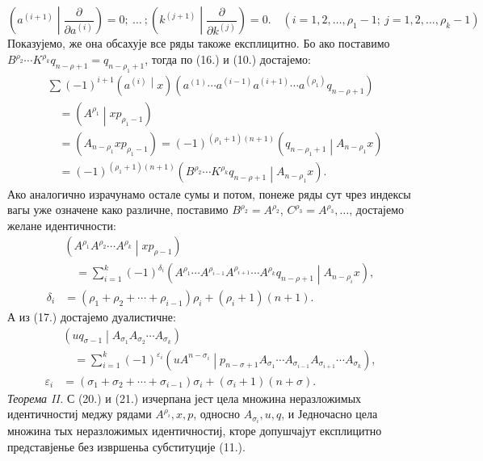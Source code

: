 \documentclass[11pt]{article}
\newcommand{\pair}[2]{\left(#1\middle|#2\right)}
\newcommand{\eps}{\varepsilon}
\begin{document}
\begin{equation}
 \left(a^{(i+1)}\middle|\frac{\partial}{\partial a^{(i)}}\right)=0;\ \ldots\ ;
 \left(k^{(j+1)}\middle|\frac{\partial}{\partial k^{(j)}}\right)=0.
 \quad (i=1,2,\ldots,\rho_1-1;\ j=1,2,\ldots,\rho_k-1)
\tag{19}
\end{equation}
Показујемо, же она обсахује все ряды такоже експлицитно. Бо ако поставимо $B^{\rho_2}\cdots K^{\rho_k}q_{n-\rho+1}=q_{n-\rho_1+1}$, тогда по (16.) и (10.) достајемо:
\[
\begin{aligned}
&\sum(-1)^{i+1}\pair{a^{(i)}}{x}
(a^{(1)}\cdots a^{(i-1)}a^{(i+1)}\cdots a^{(\rho_1)}q_{n-\rho+1})\\
&\quad=\pair{A^{\rho_1}}{xp_{\rho_1-1}}\\
&\quad=(A_{n-\rho_1}xp_{\rho_1-1})
=(-1)^{(\rho_1+1)(n+1)}\pair{q_{n-\rho_1+1}}{A_{n-\rho_1}x}\\
&\quad=(-1)^{(\rho_1+1)(n+1)}
\pair{B^{\rho_2}\cdots K^{\rho_k}q_{n-\rho+1}}{A_{n-\rho_1}x}.
\end{aligned}
\]
Ако аналогично израчунамо остале сумы и потом, понеже ряды сут чрез индексы вагы уже означене како различне, поставимо $B^{\rho_2}=A^{\rho_2}$, $C^{\rho_3}=A^{\rho_3},\ldots$, достајемо желане идентичности:
\begin{equation}
\begin{aligned}
&\pair{A^{\rho_1}A^{\rho_2}\cdots A^{\rho_k}}{xp_{\rho-1}}\\
&\quad=\sum_{i=1}^{k}(-1)^{\delta_i}
\pair{A^{\rho_1}\cdots A^{\rho_{i-1}}A^{\rho_{i+1}}\cdots A^{\rho_k}q_{n-\rho+1}}{A_{n-\rho_i}x},\\
\delta_i&=(\rho_1+\rho_2+\cdots+\rho_{i-1})\rho_i+(\rho_i+1)(n+1).
\end{aligned}
\tag{20}
\end{equation}
А из (17.) достајемо дуалистичне:
\begin{equation}
\begin{aligned}
&\pair{u q_{\sigma-1}}{A_{\sigma_1}A_{\sigma_2}\cdots A_{\sigma_k}}\\
&\quad=\sum_{i=1}^{k}(-1)^{\eps_i}
\pair{u A^{n-\sigma_i}}{p_{n-\sigma+1}A_{\sigma_1}\cdots A_{\sigma_{i-1}}A_{\sigma_{i+1}}\cdots A_{\sigma_k}},\\
\eps_i&=(\sigma_1+\sigma_2+\cdots+\sigma_{i-1})\sigma_i+(\sigma_i+1)(n+\sigma).
\end{aligned}
\tag{21}
\end{equation}
\emph{Теорема II.} С (20.) и (21.) изчерпана јест цела множина неразложимых идентичностиј меджу рядами $A^{\rho_i},x,p$, односно $A_{\sigma_i},u,q$, и Једночасно цела множина тых неразложимых идентичностиј, кторе допушчајут експлицитно представјенье без извршеньа субституције (11.).
\end{document}
